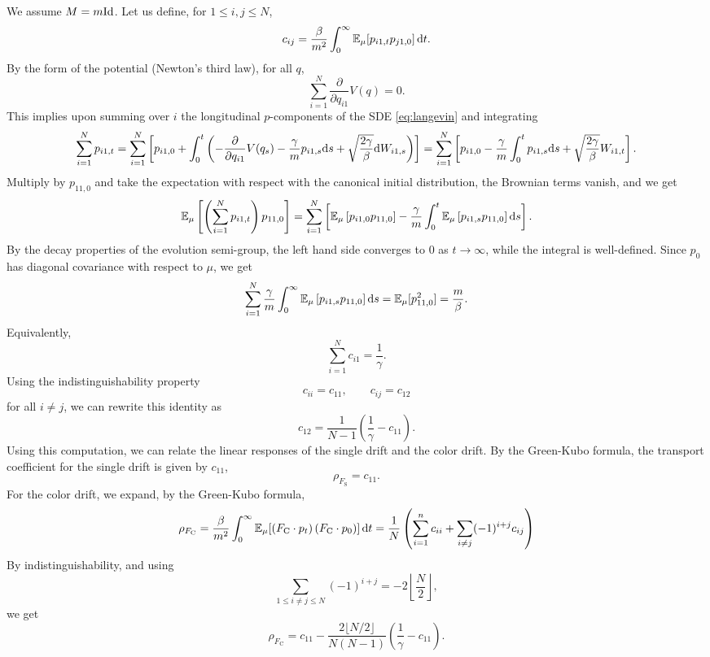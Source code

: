 \begin{example}
We assume $M=m\mathrm{Id}$. Let us define, for $1\leq i,j\leq N$,
\[c_{ij}=\frac{\beta}{m^2} \int_{0}^\infty \mathbb{E}_\mu[p_{i1,t}p_{j1,0}]\,\mathrm{d} t.\]
By the form of the potential (Newton's third law), for all $q$,
\[\sum_{i=1}^N \frac{\partial}{\partial q_{i1}}V(q)=0.\]
This implies upon summing over $i$ the longitudinal $p$-components of the SDE \eqref{eq:langevin} and integrating
\[\sum_{i=1}^N p_{i1,t}= \sum_{i=1}^N \left[p_{i1,0}+\int_0^t \left(-\frac{\partial}{\partial q_{i1}}V(q_s)-\frac{\gamma}{m} p_{i1,s}\mathrm{d} s +\sqrt{\frac{2\gamma}\beta}\mathrm{d} W_{i1,s}\right)\right]=
\sum_{i=1}^N \left[p_{i1,0}-\frac{\gamma}{m}\int_0^t  p_{i1,s}\mathrm{d} s +\sqrt{\frac{2\gamma}\beta} W_{i1,t}\right].\]
Multiply by $p_{11,0}$ and take the expectation with respect with the canonical initial distribution, the Brownian terms vanish, and we get
\begin{equation}
    \mathbb{E}_\mu\left[\left(\sum_{i=1}^N p_{i1,t}\right)p_{11,0}\right]=\sum_{i=1}^N\left[ \mathbb{E}_\mu\left[p_{i1,0}p_{11,0}\right]-\frac{\gamma}{m}\int_0^t \mathbb{E}_\mu\left[p_{i1,s}p_{11,0}\right]\mathrm{d} s\right].
\end{equation}
By the decay properties of the evolution semi-group, the left hand side converges to $0$ as $t\to \infty$, while the integral is well-defined. Since $p_0$ has diagonal covariance with respect to $\mu$, we get
\begin{equation}
    \sum_{i=1}^N \frac{\gamma}m\int_0^\infty \mathbb{E}_\mu\left[p_{i1,s}p_{11,0}\right]\mathrm{d} s=\mathbb{E}_\mu[p_{11,0}^2]=\frac{m}{\beta}.
\end{equation}
Equivalently, 
\[\sum_{i=1}^N c_{i1}=\frac{1}{\gamma}.\]
Using the indistinguishability property
 \[c_{ii}=c_{11},\qquad c_{ij}=c_{12}\] for all $i\neq j$,
 we can rewrite this identity as 
 \[c_{12}=\frac{1}{N-1}\left(\frac{1}{\gamma}-c_{11}\right).\]
Using this computation, we can relate the linear responses of the single drift and the color drift.
By the Green-Kubo formula, the transport coefficient for the single drift is given by $c_{11}$,
\[\rho_{F_{\mathrm{S}}}=c_{11}.\]
For the color drift, we expand, by the Green-Kubo formula,
\[\rho_{F_{\mathrm{C}}}=\frac{\beta}{m^2} \int_0^\infty \mathbb{E}_\mu[\left(F_{\mathrm{C}}\cdot p_t\right)\left(F_{\mathrm{C}}\cdot p_0\right)]\,\mathrm{d} t=\frac1N\left(\sum_{i=1}^n c_{ii} + \sum_{i\neq j}(-1)^{i+j}c_{ij}\right)\]
By indistinguishability, and using
\[\sum_{1\leq i\neq j\leq N}(-1)^{i+j}=-2\left\lfloor \frac{N}{2}\right\rfloor,\]
we get 
\begin{equation}
    \rho_{F_{\mathrm{C}}}=c_{11}-\frac{2\lfloor N/2 \rfloor}{N(N-1)}\left(\frac1{\gamma}-c_{11}\right).
\end{equation}
\end{example}
